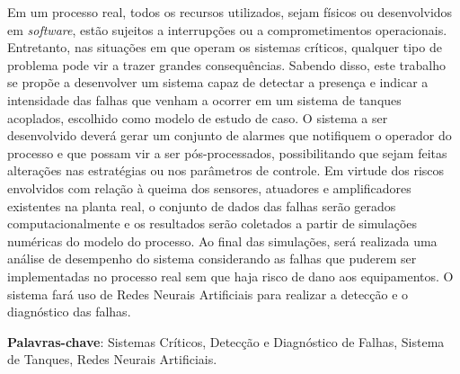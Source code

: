 Em um processo real, todos os recursos utilizados, sejam físicos ou
desenvolvidos em {\it software}, estão sujeitos a interrupções ou a
comprometimentos operacionais. Entretanto, nas situações em que operam os
sistemas críticos, qualquer tipo de problema pode vir a trazer grandes
consequências. Sabendo disso, este trabalho se propõe a desenvolver um sistema
capaz de detectar a presença e indicar a intensidade das falhas que venham a
ocorrer em um sistema de tanques acoplados, escolhido como modelo de estudo de
caso. O sistema a ser desenvolvido deverá gerar um conjunto de alarmes que
notifiquem o operador do processo e que possam vir a ser pós-processados,
possibilitando que sejam feitas alterações nas estratégias ou nos parâmetros de
controle. Em virtude dos riscos envolvidos com relação à queima dos sensores,
atuadores e amplificadores existentes na planta real, o conjunto de dados das
falhas serão gerados computacionalmente e os resultados serão coletados a partir
de simulações numéricas do modelo do processo. Ao final das simulações, será
realizada uma análise de desempenho do sistema considerando as falhas que
puderem ser implementadas no processo real sem que haja risco de dano aos
equipamentos. O sistema fará uso de Redes Neurais Artificiais para realizar a
detecção e o diagnóstico das falhas.

\vspace{1.5ex}

{\bf Palavras-chave}: Sistemas Críticos, Detecção e Diagnóstico de Falhas,
Sistema de Tanques, Redes Neurais Artificiais.
